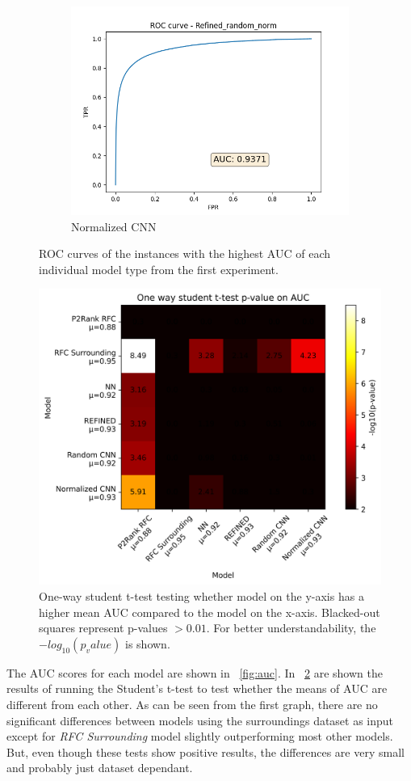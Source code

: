 \begin{figure}
\begin{subfigure}{0.45\textwidth}
    \includegraphics[width=0.95\linewidth]{norm_roc.png}
    \caption{Normalized CNN}
\end{subfigure}%
\caption{ROC curves of the instances with the highest AUC of each individual model type from the first experiment.}
\label{fig:roc_curves}
\end{figure}

\begin{figure}
    \centering
    \includegraphics[width=0.75\linewidth]{ab1.png}
    \caption{One-way student t-test testing whether model on the y-axis has a higher mean AUC compared to the model on the x-axis. Blacked-out squares represent p-values $> 0.01$. For better understandability, the $-log_{10}(p_value)$ is shown.}
    \label{fig:ab1}
\end{figure}

The AUC scores for each model are shown in ~\ref{fig:auc}. In ~\ref{fig:ab1} are shown the results of running the Student's t-test to test whether the means of AUC are different from each other. As can be seen from the first graph, there are no significant differences between models using the surroundings dataset as input except for \textit{RFC Surrounding} model slightly outperforming most other models. But, even though these tests show positive results, the differences are very small and probably just dataset dependant.

